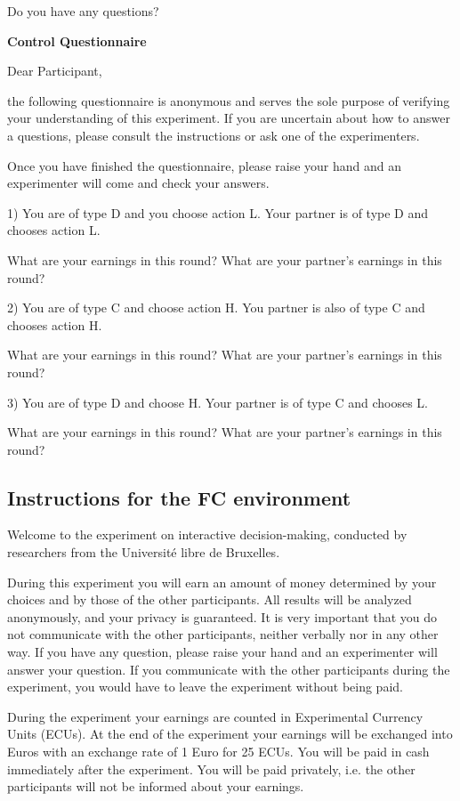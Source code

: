 \documentclass[12pt]{article}
\theoremstyle{break}
\begin{document}
Do you have any questions? 

\textbf{Control Questionnaire}

Dear Participant,

the following questionnaire is anonymous and serves the sole purpose of verifying your understanding of this experiment. If you are uncertain about how to answer a questions, please consult the instructions or ask one of the experimenters.

Once you have finished the questionnaire, please raise your hand and an experimenter will come and check your answers.

1) You are of type D and you choose action L. Your partner is of type D and chooses action L.

What are your earnings in this round?
What are your partner’s earnings in this round?

2) You are of type C and choose action H. You partner is also of type C and chooses action H.

What are your earnings in this round?
What are your partner’s earnings in this round?


3) You are of type D and choose H. Your partner is of type C and chooses L.

What are your earnings in this round?
What are your partner’s earnings in this round?


\subsection{Instructions for the FC environment}

Welcome to the experiment on interactive decision-making, conducted by researchers from the Université libre de Bruxelles.

During this experiment you will earn an amount of money determined by your choices and by those of the other participants. All results will be analyzed anonymously, and your privacy is guaranteed. It is very important that you do not communicate with the other participants, neither verbally nor in any other way. If you have any question, please raise your hand and an experimenter will answer your question. If you communicate with the other participants during the experiment, you would have to leave the experiment without being paid. 

During the experiment your earnings are counted in Experimental Currency Units (ECUs). At the end of the experiment your earnings will be exchanged into Euros with an exchange rate of 1 Euro for 25 ECUs. You will be paid in cash immediately after the experiment. You will be paid privately, i.e. the other participants will not be informed about your earnings.
\end{document}
